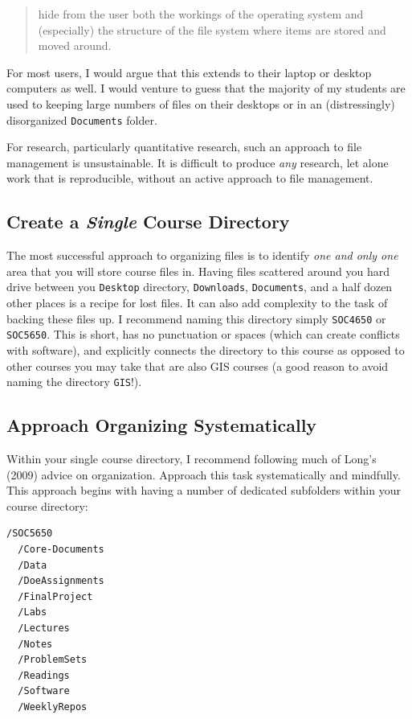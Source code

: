 \documentclass[]{book}
\theoremstyle{definition}
\theoremstyle{definition}
\theoremstyle{remark}
\begin{document}
\begin{quote}
hide from the user both the workings of the operating system and
(especially) the structure of the file system where items are stored and
moved around.
\end{quote}

For most users, I would argue that this extends to their laptop or
desktop computers as well. I would venture to guess that the majority of
my students are used to keeping large numbers of files on their desktops
or in an (distressingly) disorganized \texttt{Documents} folder.

For research, particularly quantitative research, such an approach to
file management is unsustainable. It is difficult to produce \emph{any}
research, let alone work that is reproducible, without an active
approach to file management.

\subsection{\texorpdfstring{Create a \emph{Single} Course
Directory}{Create a Single Course Directory}}\label{create-a-single-course-directory}

The most successful approach to organizing files is to identify
\emph{one and only one} area that you will store course files in. Having
files scattered around you hard drive between you \texttt{Desktop}
directory, \texttt{Downloads}, \texttt{Documents}, and a half dozen
other places is a recipe for lost files. It can also add complexity to
the task of backing these files up. I recommend naming this directory
simply \texttt{SOC4650} or \texttt{SOC5650}. This is short, has no
punctuation or spaces (which can create conflicts with software), and
explicitly connects the directory to this course as opposed to other
courses you may take that are also GIS courses (a good reason to avoid
naming the directory \texttt{GIS}!).

\subsection{Approach Organizing
Systematically}\label{approach-organizing-systematically}

Within your single course directory, I recommend following much of
Long's (2009) advice on organization. Approach this task systematically
and mindfully. This approach begins with having a number of dedicated
subfolders within your course directory:

\begin{verbatim}
/SOC5650
  /Core-Documents
  /Data
  /DoeAssignments
  /FinalProject
  /Labs
  /Lectures
  /Notes
  /ProblemSets
  /Readings
  /Software
  /WeeklyRepos
\end{verbatim}
\end{document}

